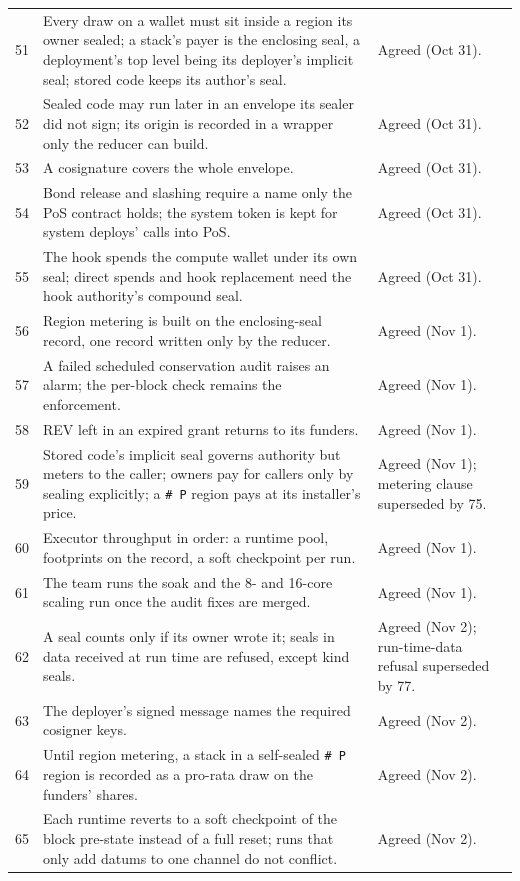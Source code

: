 \documentclass[11pt]{article}
\begin{document}
\begin{longtable}{@{}P{0.8cm}P{9.4cm}P{4.8cm}@{}}
51 & Every draw on a wallet must sit inside a region its owner sealed; a stack's payer is the enclosing seal, a deployment's top level being its deployer's implicit seal; stored code keeps its author's seal. & Agreed (Oct 31). \\
52 & Sealed code may run later in an envelope its sealer did not sign; its origin is recorded in a wrapper only the reducer can build. & Agreed (Oct 31). \\
53 & A cosignature covers the whole envelope. & Agreed (Oct 31). \\
54 & Bond release and slashing require a name only the PoS contract holds; the system token is kept for system deploys' calls into PoS. & Agreed (Oct 31). \\
55 & The hook spends the compute wallet under its own seal; direct spends and hook replacement need the hook authority's compound seal. & Agreed (Oct 31). \\
56 & Region metering is built on the enclosing-seal record, one record written only by the reducer. & Agreed (Nov 1). \\
57 & A failed scheduled conservation audit raises an alarm; the per-block check remains the enforcement. & Agreed (Nov 1). \\
58 & REV left in an expired grant returns to its funders. & Agreed (Nov 1). \\
59 & Stored code's implicit seal governs authority but meters to the caller; owners pay for callers only by sealing explicitly; a \texttt{\# P} region pays at its installer's price. & Agreed (Nov 1); metering clause superseded by 75. \\
60 & Executor throughput in order: a runtime pool, footprints on the record, a soft checkpoint per run. & Agreed (Nov 1). \\
61 & The team runs the soak and the 8- and 16-core scaling run once the audit fixes are merged. & Agreed (Nov 1). \\
62 & A seal counts only if its owner wrote it; seals in data received at run time are refused, except kind seals. & Agreed (Nov 2); run-time-data refusal superseded by 77. \\
63 & The deployer's signed message names the required cosigner keys. & Agreed (Nov 2). \\
64 & Until region metering, a stack in a self-sealed \texttt{\# P} region is recorded as a pro-rata draw on the funders' shares. & Agreed (Nov 2). \\
65 & Each runtime reverts to a soft checkpoint of the block pre-state instead of a full reset; runs that only add datums to one channel do not conflict. & Agreed (Nov 2). \\

\end{longtable}
\end{document}
